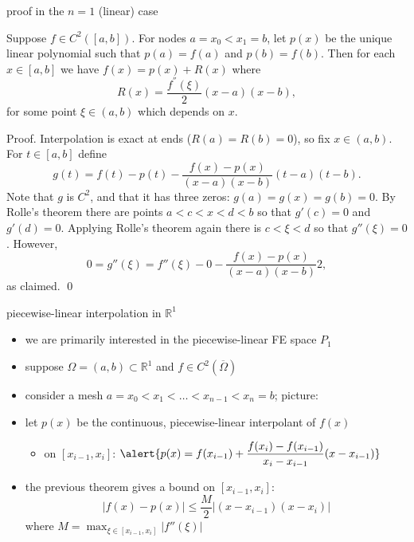 \documentclass[10pt,
               svgnames,
               hyperref={colorlinks,
                         citecolor=DeepPink4,
                         linkcolor=FireBrick,
                         urlcolor=blue},
               usepdftitle=false]{beamer}
\newcommand{\RR}{\mathbb{R}}
\newcommand{\ds}{\displaystyle}
\begin{document}
\begin{frame}{proof in the $n=1$ (linear) case}

\begin{theorem}
Suppose $f\in C^2([a,b])$.  For nodes $a=x_0<x_1=b$, let $p(x)$ be the unique linear polynomial such that $p(a)=f(a)$ and $p(b)=f(b)$.  Then for each $x\in [a,b]$ we have $f(x) = p(x) + R(x)$ where
    $$R(x) = \frac{f^{''}(\xi)}{2} (x-a)(x-b),$$
for some point $\xi \in (a,b)$ which depends on $x$.
\end{theorem}

\medskip
{\footnotesize
Proof.  Interpolation is exact at ends ($R(a)=R(b)=0$), so fix $x\in (a,b)$.  For $t\in [a,b]$ define
	$$g(t) = f(t) - p(t) - \frac{f(x)-p(x)}{(x-a)(x-b)} (t-a)(t-b).$$
Note that $g$ is $C^2$, and that it has three zeros: $g(a)=g(x)=g(b)=0$.  By Rolle's theorem there are points $a<c<x<d<b$ so that $g'(c)=0$ and $g'(d)=0$.  Applying Rolle's theorem again there is $c<\xi<d$ so that $g''(\xi)=0$.  However,
	$$0=g''(\xi)=f''(\xi) - 0 - \frac{f(x)-p(x)}{(x-a)(x-b)} 2,$$
as claimed. \hfill \qed
}
\end{frame}


\begin{frame}{piecewise-linear interpolation in $\RR^1$}

\begin{itemize}
\item we are primarily interested in the \alert{piecewise-linear} FE space $P_1$
\item suppose $\Omega=(a,b) \subset \RR^1$ and $f\in C^2(\overline\Omega)$
\item consider a mesh $a=x_0<x_1<\dots<x_{n-1}<x_n=b$; \quad picture:

\vspace{20mm}
\item let $p(x)$ be the continuous, piecewise-linear interpolant of $f(x)$
    \begin{itemize}
    \item[$\circ$] on $[x_{i-1},x_i]$: \quad $\ds \alert{p(x) = f(x_{i-1}) + \frac{f(x_i) - f(x_{i-1})}{x_i - x_{i-1}} (x-x_{i-1})}$
    \end{itemize}
\item the previous theorem gives a bound on $[x_{i-1},x_i]$:
	$$|f(x) - p(x)| \le \frac{M}{2} |(x-x_{i-1})(x-x_i)|$$
where $\ds M=\max_{\xi\in [x_{i-1},x_i]} |f''(\xi)|$
\end{itemize}
\end{frame}
\end{document}
